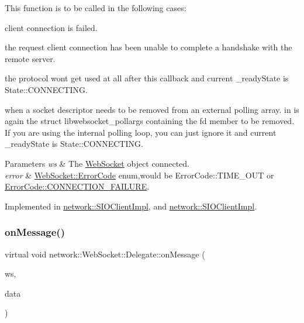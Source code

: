 This function is to be called in the following cases\+:
\begin{DoxyEnumerate}
\item client connection is failed.
\item the request client connection has been unable to complete a handshake with the remote server.
\item the protocol won\textquotesingle{}t get used at all after this callback and current \+\_\+ready\+State is State\+::\+C\+O\+N\+N\+E\+C\+T\+I\+NG.
\item when a socket descriptor needs to be removed from an external polling array. in is again the struct libwebsocket\+\_\+pollargs containing the fd member to be removed. If you are using the internal polling loop, you can just ignore it and current \+\_\+ready\+State is State\+::\+C\+O\+N\+N\+E\+C\+T\+I\+NG.
\end{DoxyEnumerate}


\begin{DoxyParams}{Parameters}
{\em ws} & The \hyperlink{classnetwork_1_1WebSocket}{Web\+Socket} object connected. \\
\hline
{\em error} & \hyperlink{classnetwork_1_1WebSocket_a33c111a23355ac485e3a56c9d0ab9a59}{Web\+Socket\+::\+Error\+Code} enum,would be Error\+Code\+::\+T\+I\+M\+E\+\_\+\+O\+UT or \hyperlink{classnetwork_1_1WebSocket_a33c111a23355ac485e3a56c9d0ab9a59a9ce818a4b52e8a8c6539fe6391392369}{Error\+Code\+::\+C\+O\+N\+N\+E\+C\+T\+I\+O\+N\+\_\+\+F\+A\+I\+L\+U\+RE}. \\
\hline
\end{DoxyParams}


Implemented in \hyperlink{classnetwork_1_1SIOClientImpl_a850038d23057d9882f5d689bc7051008}{network\+::\+S\+I\+O\+Client\+Impl}, and \hyperlink{classnetwork_1_1SIOClientImpl_a903007575dfa680fc980fe11ac88b61e}{network\+::\+S\+I\+O\+Client\+Impl}.

\mbox{\label{classnetwork_1_1WebSocket_1_1Delegate_a879c2f96e39ce8d68e4fbc2827ea4377}} 
\subsubsection{\texorpdfstring{on\+Message()}{onMessage()}\hspace{0.1cm}{\footnotesize\ttfamily [1/2]}}
{\footnotesize\ttfamily virtual void network\+::\+Web\+Socket\+::\+Delegate\+::on\+Message (\begin{DoxyParamCaption}\item[{\hyperlink{classnetwork_1_1WebSocket}{Web\+Socket} $\ast$}]{ws,  }\item[{const \hyperlink{structnetwork_1_1WebSocket_1_1Data}{Data} \&}]{data }\end{DoxyParamCaption})\hspace{0.3cm}{\ttfamily [pure virtual]}}

